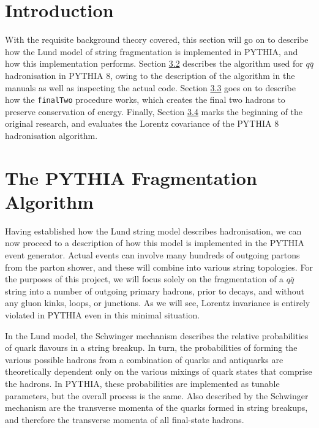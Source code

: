 \documentclass[12pt,a4paper]{report}
\begin{document}
\section{Introduction}
With the requisite background theory covered, this section will go on to describe how the Lund model of string fragmentation is implemented in PYTHIA, and how this implementation performs. Section \hyperref[sec:pythia-frag]{3.2} describes the algorithm used for $q\bar{q}$ hadronisation in PYTHIA 8, owing to the description of the algorithm in the manuals \cite{Bierlich:2022pfr,Sjostrand:2006za,PYTHIAmanualold} as well as inspecting the actual code. Section \hyperref[sec:final-two]{3.3} goes on to describe how the \texttt{finalTwo} procedure works, which creates the final two hadrons to preserve conservation of energy. Finally, Section \hyperref[sec:performance]{3.4} marks the beginning of the original research, and evaluates the Lorentz covariance of the PYTHIA 8 hadronisation algorithm.

\section{The PYTHIA Fragmentation Algorithm}
\label{sec:pythia-frag}
Having established how the Lund string model describes hadronisation, we can now proceed to a description of how this model is implemented in the PYTHIA event generator. Actual events can involve many hundreds of outgoing partons from the parton shower, and these will combine into various string topologies. For the purposes of this project, we will focus solely on the fragmentation of a $q\bar{q}$ string into a number of outgoing primary hadrons, prior to decays, and without any gluon kinks, loops, or junctions. As we will see, Lorentz invariance is entirely violated in PYTHIA even in this minimal situation.

In the Lund model, the Schwinger mechanism describes the relative probabilities of quark flavours in a string breakup. In turn, the probabilities of forming the various possible hadrons from a combination of quarks and antiquarks are theoretically dependent only on the various mixings of quark states that comprise the hadrons. In PYTHIA, these probabilities are implemented as tunable parameters, but the overall process is the same. Also described by the Schwinger mechanism are the transverse momenta of the quarks formed in string breakups, and therefore the transverse momenta of all final-state hadrons.
\end{document}
